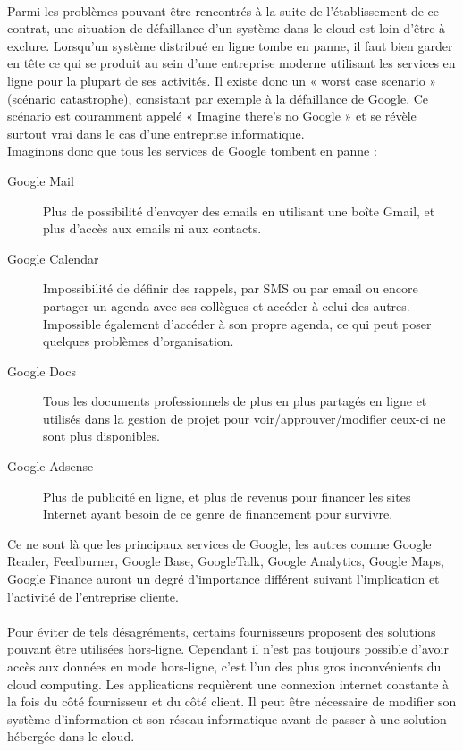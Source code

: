 \documentclass[a4paper,12pt]{report}
\begin{document}
\begin{onehalfspace}
	\paragraph*{}
	Parmi les problèmes pouvant être rencontrés à la suite de l’établissement de ce contrat, une situation de défaillance d'un système dans le cloud est loin d’être à exclure. Lorsqu'un système distribué en ligne tombe en panne, il faut bien garder en tête ce qui se produit au sein d'une entreprise moderne utilisant les services en ligne pour la plupart de ses activités. Il existe donc un « worst case scenario » (scénario catastrophe), consistant par exemple à la défaillance de Google. Ce scénario est couramment appelé « Imagine there's no Google » et se révèle surtout vrai dans le cas d'une entreprise informatique.\\
Imaginons donc que tous les services de Google tombent en panne :
\begin{description}
	\item[Google Mail]
Plus de possibilité d'envoyer des emails en utilisant une boîte Gmail, et plus d'accès aux emails ni aux contacts.
	\item[Google Calendar]
Impossibilité de définir des rappels, par SMS ou par email ou encore partager un agenda avec ses collègues et accéder à celui des autres. Impossible également d'accéder à son propre agenda, ce qui peut poser quelques problèmes d’organisation.
	\item[Google Docs]
Tous les documents professionnels de plus en plus partagés en ligne et utilisés dans la gestion de projet pour voir/approuver/modifier ceux-ci ne sont plus disponibles.
	\item[Google Adsense]
Plus de publicité en ligne, et plus de revenus pour financer les sites Internet ayant besoin de ce genre de financement pour survivre.
\end{description}
Ce ne sont là que les principaux services de Google, les autres comme Google Reader, Feedburner, Google Base, GoogleTalk, Google Analytics, Google Maps, Google Finance auront un degré d’importance différent suivant l’implication et l’activité de l’entreprise cliente.

	\paragraph*{}
	Pour éviter de tels désagréments, certains fournisseurs proposent des solutions pouvant être utilisées hors-ligne. Cependant il n’est pas toujours possible d’avoir accès aux données en mode hors-ligne, c’est l’un des plus gros inconvénients du cloud computing. Les applications requièrent une connexion internet constante à la fois du côté fournisseur et du côté client. Il peut être nécessaire de modifier son système d’information et son réseau informatique avant de passer à une solution hébergée dans le cloud.
		 

\end{onehalfspace}
\end{document}
